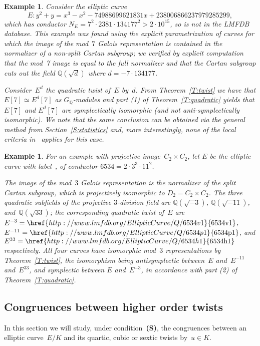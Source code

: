 \documentclass[twoside,leqno,symbols-for-thanks, draft]{rmi}
\numberwithin{equation}{section}
\newcommand{\lmfdbec}[3]{\href{http://www.lmfdb.org/EllipticCurve/Q/#1#2#3}{{\text{\rm#1#2#3}}}}
\newcommand{\Q}{\mathbb{Q}}
\newtheorem{example}[theorem]{Example}
\theoremstyle{remark}
\begin{document}
\begin{example} 
\label{Ex:LocalFail7}
Consider the elliptic curve
\[ E : y^2 + y = x^3 - x^2 - 74988699621831x +  238006866237979285299, \]
which has conductor $ N_E = 7^2 \cdot 2381 \cdot
134177^2>2\cdot10^{15}$, so is not in the LMFDB database.  This
example was found using the explicit parametrization of curves for
which the image of the mod~$7$ Galois representation is contained in
the normalizer of a non-split Cartan subgroup; we verified by explicit
computation that the mod~7 image is equal to the full normalizer and that the Cartan subgroup cuts out the field $\Q(\sqrt{d})$ where $d = -7 \cdot 134177$. 

Consider~$E^d$ the quadratic twist
of~$E$ by~$d$. 
From Theorem~\ref{T:twist} we have that $E[7] \simeq E^d[7]$ as $G_\Q$-modules and part (1) of Theorem~\ref{T:quadratic} yields that $E[7]$ and $E^d[7]$ are
symplectically isomorphic (and not anti-symplectically
isomorphic). We note that the same conclusion can be obtained via the general method from Section~\ref{S:statistics} 
and, more interestingly, none of the local criteria
in~\cite{FKSym} applies for this case.
\end{example}

\begin{example} \label{Ex:3twists}
  For an example with projective image~$C_2\times C_2$, let $E$ be the
  elliptic curve with label~\lmfdbec{6534}{a}{1}, of conductor
  $6534=2\cdot3^3\cdot11^2$.  

  The image of the mod~$3$ Galois representation is the normalizer of
  the split Cartan subgroup, which
  is projectively isomorphic to $D_2 = C_2\times C_2$.  The three quadratic
  subfields of the projective $3$-division field are $\Q(\sqrt{-3})$,
  $\Q(\sqrt{-11})$, and~$\Q(\sqrt{33})$; the corresponding quadratic
  twist of~$E$ are $E^{-3}=\lmfdbec{6534}{v}{1}$,
  $E^{-11}=\lmfdbec{6534}{p}{1}$, and $E^{33}=\lmfdbec{6534}{h}{1}$
  respectively.  All four curves have isomorphic mod~$3$
  representations by Theorem~\ref{T:twist}, the isomorphism being antisymplectic between~$E$
  and~$E^{-11}$ and~$E^{33}$, and symplectic between $E$ and~$E^{-3}$,
  in accordance with part (2) of
  Theorem~\ref{T:quadratic}.
\end{example}


\subsection{Congruences between higher order twists} \label{SS:higherCong}
In this section we will study, under condition~{\bf (S)}, the congruences between an elliptic curve~$E/K$ and its quartic, cubic or sextic twists by~$u \in K$.
\end{document}

